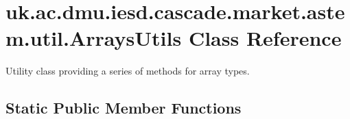 \hypertarget{classuk_1_1ac_1_1dmu_1_1iesd_1_1cascade_1_1market_1_1astem_1_1util_1_1_arrays_utils}{\section{uk.\-ac.\-dmu.\-iesd.\-cascade.\-market.\-astem.\-util.\-Arrays\-Utils Class Reference}
\label{classuk_1_1ac_1_1dmu_1_1iesd_1_1cascade_1_1market_1_1astem_1_1util_1_1_arrays_utils}
}


Utility class providing a series of methods for array types.  


\subsection*{Static Public Member Functions}
